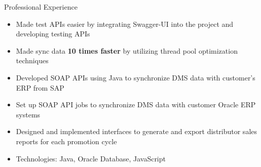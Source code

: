 \documentclass{resume}
\begin{document}
\begin{experienceSection}{Professional Experience}
    \experienceItem[
        company={Viettel Business Solutions},
        location={Ho Chi Minh City, Vietnam},
        position={Software Engineer},
        duration={Jul 2020 – May 2021}
    ]
    \begin{itemize}
        \itemsep -6pt {}
        \item Made test APIs easier by integrating Swagger-UI into the project and developing testing APIs
        \item Made sync data \textbf{10 times faster} by utilizing thread pool optimization techniques
        \item Developed SOAP APIs using Java to synchronize DMS data with customer's ERP from SAP
        \item Set up SOAP API jobs to synchronize DMS data with customer Oracle ERP systems
        \item Designed and implemented interfaces to generate and export distributor sales reports for each promotion cycle
        \item Technologies: Java, Oracle Database, JavaScript
    \end{itemize}

\end{experienceSection}
\end{document}
